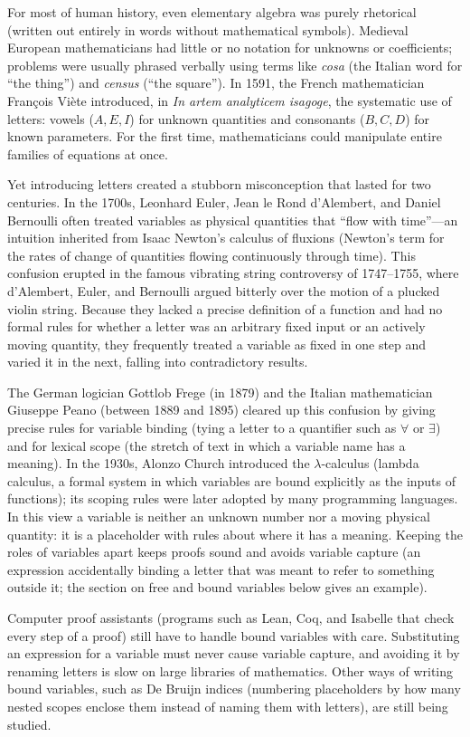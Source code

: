 \begin{historybox}
For most of human history, even elementary algebra was purely rhetorical (written out entirely in words without mathematical symbols). Medieval European mathematicians had little or no notation for unknowns or coefficients; problems were usually phrased verbally using terms like \emph{cosa} (the Italian word for ``the thing'') and \emph{census} (``the square''). In 1591, the French mathematician Fran\c{c}ois Vi\`ete introduced, in \emph{In artem analyticem isagoge}, the systematic use of letters: vowels ($A, E, I$) for unknown quantities and consonants ($B, C, D$) for known parameters. For the first time, mathematicians could manipulate entire families of equations at once.

Yet introducing letters created a stubborn misconception that lasted for two centuries. In the 1700s, Leonhard Euler, Jean le Rond d'Alembert, and Daniel Bernoulli often treated variables as physical quantities that ``flow with time''---an intuition inherited from Isaac Newton's calculus of fluxions (Newton's term for the rates of change of quantities flowing continuously through time). This confusion erupted in the famous vibrating string controversy of 1747--1755, where d'Alembert, Euler, and Bernoulli argued bitterly over the motion of a plucked violin string. Because they lacked a precise definition of a function and had no formal rules for whether a letter was an arbitrary fixed input or an actively moving quantity, they frequently treated a variable as fixed in one step and varied it in the next, falling into contradictory results.

The German logician Gottlob Frege (in 1879) and the Italian mathematician Giuseppe Peano (between 1889 and 1895) cleared up this confusion by giving precise rules for variable binding (tying a letter to a quantifier such as $\forall$ or $\exists$) and for lexical scope (the stretch of text in which a variable name has a meaning). In the 1930s, Alonzo Church introduced the $\lambda$-calculus (lambda calculus, a formal system in which variables are bound explicitly as the inputs of functions); its scoping rules were later adopted by many programming languages. In this view a variable is neither an unknown number nor a moving physical quantity: it is a placeholder with rules about where it has a meaning. Keeping the roles of variables apart keeps proofs sound and avoids variable capture (an expression accidentally binding a letter that was meant to refer to something outside it; the section on free and bound variables below gives an example).

Computer proof assistants (programs such as Lean, Coq, and Isabelle that check every step of a proof) still have to handle bound variables with care. Substituting an expression for a variable must never cause variable capture, and avoiding it by renaming letters is slow on large libraries of mathematics. Other ways of writing bound variables, such as De Bruijn indices (numbering placeholders by how many nested scopes enclose them instead of naming them with letters), are still being studied.
\end{historybox}

